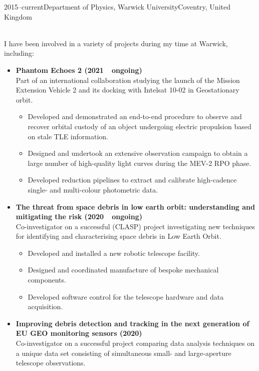 \documentclass[print]{cv-style}
\begin{document}
\begin{entrylist}
\entry
  {\small 2015--current}{Department of Physics, Warwick University}{Coventry, United Kingdom}
  {\\
  I have been involved in a variety of projects during my time at Warwick, including:
  \begin{itemize}
    \item \textbf{Phantom Echoes 2 (2021~\textendash~ongoing)}\\
    Part of an international collaboration studying the launch of the Mission Extension Vehicle 2 and its docking with Intelsat 10-02 in Geostationary orbit.
    \begin{itemize}
    \item Developed and demonstrated an end-to-end procedure to observe and recover orbital custody of an object undergoing electric propulsion based on stale TLE information.
    \item Designed and undertook an extensive observation campaign to obtain a large number of high-quality light curves during the MEV-2 RPO phase.
    \item Developed reduction pipelines to extract and calibrate high-cadence single- and multi-colour photometric data.
    \end{itemize}
    \item \textbf{The threat from space debris in low earth orbit: understanding and mitigating the risk (2020~\textendash~ongoing)}\\
    Co-investigator on a successful  (CLASP) project investigating new techniques for identifying and characterising space debris in Low Earth Orbit.
    \begin{itemize}
    \item Developed and installed a new robotic telescope facility.
    \item Designed and coordinated manufacture of bespoke mechanical components.
    \item Developed software control for the telescope hardware and data acquisition.
    \end{itemize}
    \item \textbf{Improving debris detection and tracking in the next generation of EU GEO monitoring sensors (2020)}\\
    Co-investigator on a successful  project comparing data analysis techniques on a unique data set consisting of simultaneous small- and large-aperture telescope observations.

\end{itemize}}
\end{entrylist}
\end{document}
